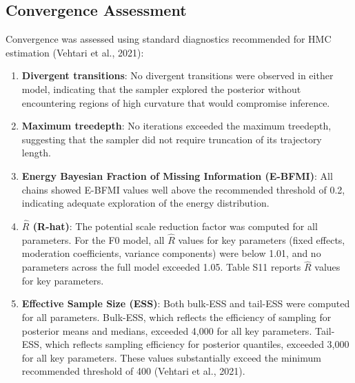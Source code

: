 \documentclass[
  english,
  man,floatsintext]{apa6}
\begin{document}
\subsection{Convergence Assessment}\label{convergence-assessment}

Convergence was assessed using standard diagnostics recommended for HMC estimation (Vehtari et al., 2021):

\begin{enumerate}
\def\labelenumi{\arabic{enumi}.}
\item
  \textbf{Divergent transitions}: No divergent transitions were observed in either model, indicating that the sampler explored the posterior without encountering regions of high curvature that would compromise inference.
\item
  \textbf{Maximum treedepth}: No iterations exceeded the maximum treedepth, suggesting that the sampler did not require truncation of its trajectory length.
\item
  \textbf{Energy Bayesian Fraction of Missing Information (E-BFMI)}: All chains showed E-BFMI values well above the recommended threshold of 0.2, indicating adequate exploration of the energy distribution.
\item
  \textbf{\(\hat{R}\) (R-hat)}: The potential scale reduction factor was computed for all parameters. For the F0 model, all \(\hat{R}\) values for key parameters (fixed effects, moderation coefficients, variance components) were below 1.01, and no parameters across the full model exceeded 1.05. Table S11 reports \(\hat{R}\) values for key parameters.
\item
  \textbf{Effective Sample Size (ESS)}: Both bulk-ESS and tail-ESS were computed for all parameters. Bulk-ESS, which reflects the efficiency of sampling for posterior means and medians, exceeded 4,000 for all key parameters. Tail-ESS, which reflects sampling efficiency for posterior quantiles, exceeded 3,000 for all key parameters. These values substantially exceed the minimum recommended threshold of 400 (Vehtari et al., 2021).
\end{enumerate}
\end{document}
